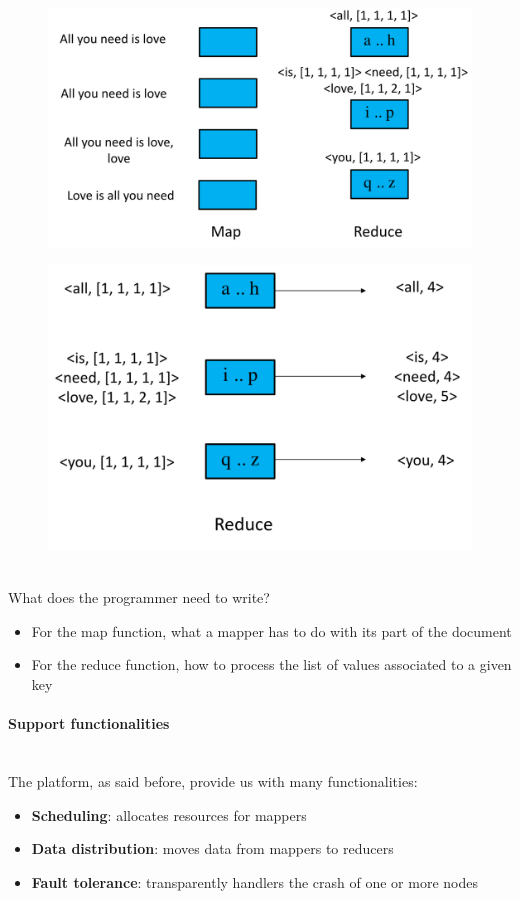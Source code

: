 \documentclass[10pt,a4paper]{article}
\newcommand{\myparagraph}[1]{\paragraph{#1}\mbox{}\\[0.05in]}
\begin{document}
\begin{figure}[h!]
\centering
\begin{minipage}{.5\textwidth}
  \centering
  \includegraphics[width=.6\linewidth]{images/map-example6.png}
  \label{fig:map-example6}
\end{minipage}%
\begin{minipage}{.5\textwidth}
  \centering
  \includegraphics[width=.6\linewidth]{images/map-example7.png}
  \label{fig:map-example7}
\end{minipage}
\end{figure}  \\
What does the programmer need to write?
\begin{itemize}
	\item For the map function, what a mapper has to do with its part of the document
	\item For the reduce function, how to process the list of values associated to a given key
\end{itemize} \pagebreak
\myparagraph{Support functionalities}
The platform, as said before, provide us with many functionalities:
\begin{itemize}
	\item \textbf{Scheduling}: allocates resources for mappers
	\item \textbf{Data distribution}: moves data from mappers to reducers
	\item \textbf{Fault tolerance}: transparently handlers the crash of one or more nodes
\end{itemize}
\end{document}
